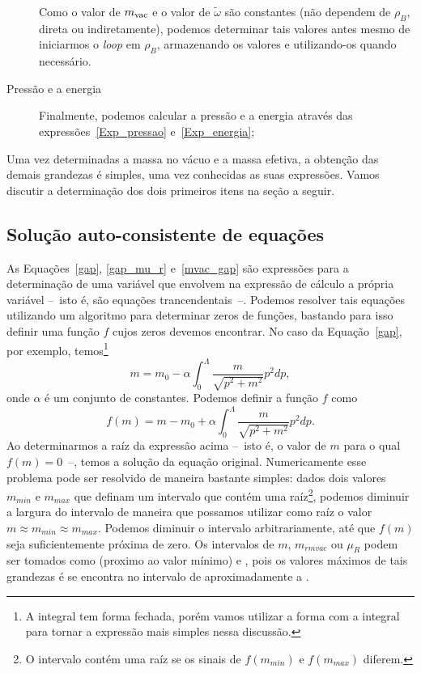 \begin{description}
\begin{description}
		\end{description}	
		Como o valor de $m_{\rm{vac}}$ e o valor de $\tilde\omega$ são constantes (não dependem de $\rho_B$, direta ou indiretamente), podemos determinar tais valores antes mesmo de iniciarmos o \emph{loop} em $\rho_B$, armazenando os valores e utilizando-os quando necessário.
	\item[Pressão e a energia] Finalmente, podemos calcular a pressão e a energia através das expressões~\eqref{Exp_pressao} e~\eqref{Exp_energia};
\end{description}
%
Uma vez determinadas a massa no vácuo e a massa efetiva, a obtenção das demais grandezas é simples, uma vez conhecidas as suas expressões. Vamos discutir a determinação dos dois primeiros itens na seção a seguir. 

\subsection{Solução auto-consistente de equações}

As Equações~\eqref{gap}, \eqref{gap_mu_r} e~\eqref{mvac_gap} são expressões para a determinação de uma variável que envolvem na expressão de cálculo a própria variável --~isto é, são equações trancendentais~--. Podemos resolver tais equações utilizando um algoritmo para determinar zeros de funções, bastando para isso definir uma função $f$ cujos zeros devemos encontrar. No caso da Equação~\eqref{gap}, por exemplo, temos\footnote{A integral tem forma fechada, porém vamos utilizar a forma com a integral para tornar a expressão mais simples nessa discussão.}
\begin{equation}
	m = m_0 - \alpha\int_0^\Lambda \frac{m}{\sqrt{p^2 + m^2}} p^2 dp,
\end{equation}
%
onde $\alpha$ é um conjunto de constantes. Podemos definir a função $f$ como
\begin{equation}
	f(m) = m - m_0 + \alpha\int_0^\Lambda \frac{m}{\sqrt{p^2 + m^2}} p^2 dp.
\end{equation}
%
Ao determinarmos a raíz da expressão acima --~isto é, o valor de $m$ para o qual $f(m) = 0$~--, temos a solução da equação original. Numericamente esse problema pode ser resolvido de maneira bastante simples: dados dois valores $m_{min}$ e $m_{max}$ que definam um intervalo que contém uma raíz\footnote{O intervalo contém uma raíz se os sinais de $f(m_{min})$ e $f(m_{max})$ diferem.}, podemos diminuir a largura do intervalo de maneira que possamos utilizar como raíz o valor $m \approx m_{min} \approx m_{max}$. Podemos diminuir o intervalo arbitrariamente, até que $f(m)$ seja suficientemente próxima de zero. Os intervalos de $m$, $m_{rm{vac}}$ ou $\mu_R$ podem ser tomados como  (proximo ao valor mínimo) e , pois os valores máximos de tais grandezas é se encontra no intervalo de aproximadamente  a .

